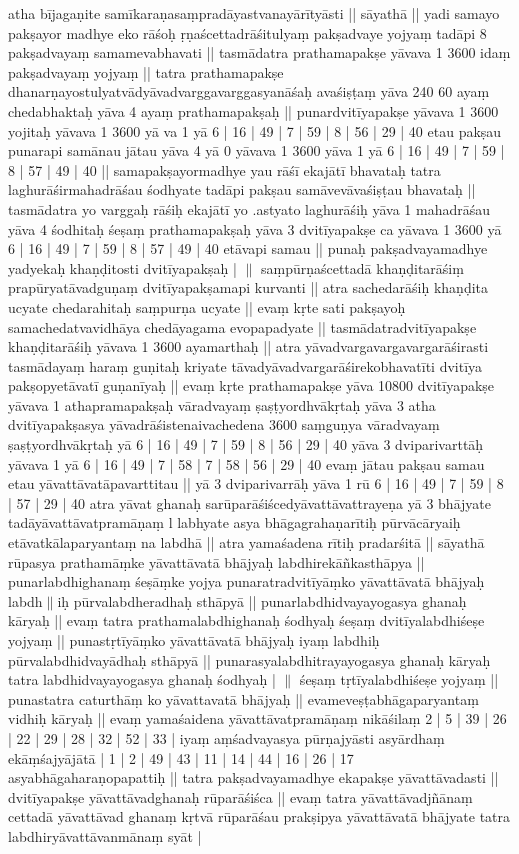 \documentclass[10pt]{article}
\begin{document}
atha   bījagaṇite samīkaraṇasaṃpradāyastvanayārītyāsti || 
sāyathā || 
yadi samayo pakṣayor madhye eko 
  rāśoḥ ṛṇaścettadrāśitulyaṃ pakṣadvaye yojyaṃ tadāpi 8 pakṣadvayaṃ samamevabhavati || 
tasmādatra  prathamapakṣe yāvava 1 3600 idaṃ pakṣadvayaṃ yojyaṃ || 
tatra prathamapakṣe 
  dhanarṇayostulyatvādyāvadvarggavarggasyanāśaḥ avaśiṣṭaṃ yāva 240 60 ayaṃ chedabhaktaḥ yāva 4 ayaṃ 
  prathamapakṣaḥ || 
punardvitīyapakṣe yāvava 1 3600 yojitaḥ yāvava 1 3600 yā va 1 yā 6 |  16 | 49 | 7 | 59 | 8 | 56 | 29 | 
  40 
etau pakṣau punarapi samānau jātau yāva 4 yā 0 yāvava 1 3600 yāva 1 yā 6 |  16 | 49 | 7 | 59 | 8 | 57 | 49 | 40 || 
samapakṣayormadhye yau rāśī ekajātī bhavataḥ  tatra laghurāśirmahadrāśau śodhyate tadāpi pakṣau 
  samāvevāvaśiṣṭau bhavataḥ || tasmādatra yo varggaḥ rāśiḥ ekajātī yo .astyato laghurāśiḥ yāva 1 mahadrāśau 
  yāva 4 śodhitaḥ śeṣaṃ prathamapakṣaḥ yāva 3 dvitīyapakṣe ca yāvava 1 3600 yā 6 |  16 | 49 | 7 | 59 | 8 | 57 | 49 | 40 
  etāvapi samau || punaḥ pakṣadvayamadhye yadyekaḥ khaṇḍitosti dvitīyapakṣaḥ | $\|$ 
  saṃpūrṇaścettadā khaṇḍitarāśiṃ prapūryatāvadguṇaṃ dvitīyapakṣamapi kurvanti || atra sachedarāśiḥ khaṇḍita 
  ucyate chedarahitaḥ saṃpurṇa ucyate || evaṃ kṛte sati pakṣayoḥ samachedatvavidhāya chedāyagama 
  evopapadyate || tasmādatradvitīyapakṣe khaṇḍitarāśiḥ yāvava 1 3600 ayamarthaḥ || atra 
  yāvadvargavargavargarāśirasti tasmādayaṃ haraṃ guṇitaḥ kriyate tāvadyāvadvargarāśirekobhavatīti dvitīya 
  pakṣopyetāvatī guṇanīyaḥ || evaṃ kṛte prathamapakṣe yāva 10800 dvitīyapakṣe yāvava 1 athapramapakṣaḥ 
  vāradvayaṃ ṣaṣṭyordhvākṛtaḥ yāva 3 atha dvitīyapakṣasya yāvadrāśistenaivachedena 3600 saṃguṇya 
  vāradvayaṃ ṣaṣṭyordhvākṛtaḥ yā 6 |  16 | 49 | 7 | 59 | 8 | 56 | 29 | 40  yāva 3 dviparivarttāḥ yāvava 1 yā 6 |  16 | 49 | 7 | 
  58 | 7 | 58 | 56 | 29 | 40  evaṃ jātau pakṣau samau etau yāvattāvatāpavarttitau || yā 3 dviparivarrāḥ yāva 1 rū 6 |  16 | 49 | 7 | 
  59 | 8 | 57 | 29 | 40  atra yāvat ghanaḥ sarūparāśiścedyāvattāvattrayeṇa yā 3 bhājyate tadāyāvattāvatpramāṇaṃ l
  labhyate asya bhāgagrahaṇarītiḥ pūrvācāryaiḥ etāvatkālaparyantaṃ na labdhā || atra yamaśadena rītiḥ pradarśitā || 
  sāyathā rūpasya prathamāṃke yāvattāvatā bhājyaḥ labdhirekāñkasthāpya || punarlabdhighanaṃ śeṣāṃke yojya 
  punaratradvitīyāṃko yāvattāvatā bhājyaḥ labdh$\|$iḥ pūrvalabdheradhaḥ sthāpyā || punarlabdhidvayayogasya ghanaḥ 
  kāryaḥ || evaṃ tatra prathamalabdhighanaḥ śodhyaḥ śeṣaṃ dvitīyalabdhiśeṣe yojyaṃ || punastṛtīyāṃko 
  yāvattāvatā bhājyaḥ iyaṃ labdhiḥ pūrvalabdhidvayādhaḥ sthāpyā || punarasyalabdhitrayayogasya ghanaḥ kāryaḥ 
  tatra labdhidvayayogasya ghanaḥ śodhyaḥ | $\|$ %
śeṣaṃ tṛtīyalabdhiśeṣe  yojyaṃ || punastatra caturthāṃ ko yāvattavatā bhājyaḥ || evameveṣṭabhāgaparyantaṃ vidhiḥ kāryaḥ || 
evaṃ yamaśaidena  yāvattāvatpramāṇaṃ nikāśilaṃ  2 | 5 | 39 | 26 | 22 | 29 | 28 | 32 | 52 | 33 | iyaṃ 
  aṃśadvayasya pūrṇajyāsti asyārdhaṃ ekāṃśajyājātā | 1 | 2 | 49 | 43 | 11 | 14 | 44 | 16 | 26 | 17 
asyabhāgaharaṇopapattiḥ  || 
tatra pakṣadvayamadhye ekapakṣe yāvattāvadasti || 
dvitīyapakṣe   yāvattāvadghanaḥ rūparāśiśca || 
evaṃ tatra yāvattāvadjñānaṃ cettadā yāvattāvad ghanaṃ kṛtvā 
  rūparāśau prakṣipya yāvattāvatā bhājyate tatra labdhiryāvattāvanmānaṃ syāt | 
  
\end{document}
